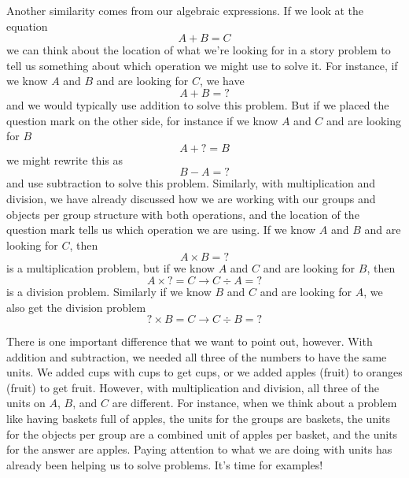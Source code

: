 \documentclass{ximera}
\begin{document}
Another similarity comes from our algebraic expressions. If we look at the equation
\[
A + B = C
\]
we can think about the location of what we're looking for in a story problem to tell us something about which operation we might use to solve it. For instance, if we know $A$ and $B$ and are looking for $C$, we have
\[
A + B = ?
\]
and we would typically use addition to solve this problem. But if we placed the question mark on the other side, for instance if we know $A$ and $C$ and are looking for $B$
\[
A + ? = B
\]
we might rewrite this as 
\[
B - A = ?
\]
and use subtraction to solve this problem. Similarly, with multiplication and division, we have already discussed how we are working with our groups and objects per group structure with both operations, and the location of the question mark tells us which operation we are using. If we know $A$ and $B$ and are looking for $C$, then
\[
A \times B = ?
\]
is a multiplication problem, but if we know $A$ and $C$ and are looking for $B$, then
\[
A \times ? = C \rightarrow C \div A = ?
\]
is a division problem. Similarly if we know $B$ and $C$ and are looking for $A$, we also get the division problem
\[
? \times B = C \rightarrow C \div B = ?
\]

There is one important difference that we want to point out, however. With addition and subtraction, we needed all three of the numbers to have the same units. We added cups with cups to get cups, or we added apples (fruit) to oranges (fruit) to get fruit. However, with multiplication and division, all three of the units on $A$, $B$, and $C$ are different. For instance, when we think about a problem like having baskets full of apples, the units for the groups are baskets, the units for the objects per group are a combined unit of apples per basket, and the units for the answer are apples. Paying attention to what we are doing with units has already been helping us to solve problems. It's time for examples!
\end{document}
